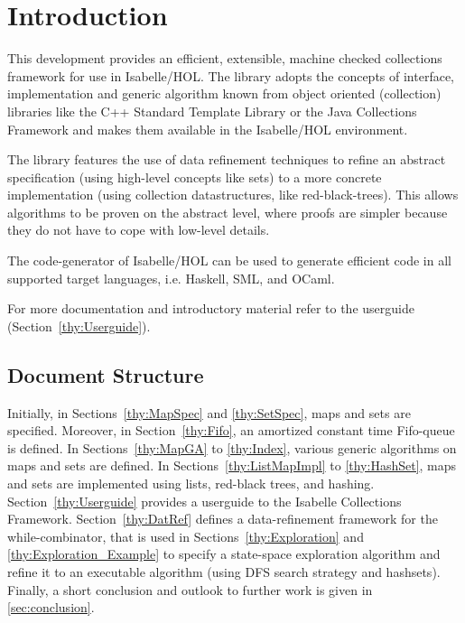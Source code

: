 \section{Introduction}
  This development provides an efficient, extensible, machine checked collections framework for use
  in Isabelle/HOL. The library adopts the concepts of interface, implementation and generic algorithm
  known from object oriented (collection) libraries like the C++ Standard Template Library\cite{C++STL} or 
  the Java Collections Framework\cite{JavaCollFr} and makes them available in the Isabelle/HOL environment.

  The library features the use of data refinement techniques to refine an abstract specification (using high-level concepts like sets) to a more concrete implementation (using collection datastructures, like red-black-trees). This allows algorithms to be proven on the abstract level, where proofs are simpler because they do not have
  to cope with low-level details.

  The code-generator of Isabelle/HOL can be used to generate efficient code in all supported target languages, i.e. Haskell, SML, and OCaml.

  For more documentation and introductory material refer to the userguide (Section~\ref{thy:Userguide}).

\subsection{Document Structure}
  Initially, in Sections~\ref{thy:MapSpec} and \ref{thy:SetSpec}, maps and sets are specified.
  Moreover, in Section~\ref{thy:Fifo}, an amortized constant time Fifo-queue is defined.
  In Sections~\ref{thy:MapGA} to \ref{thy:Index}, various generic algorithms on maps and sets are defined.
  In Sections~\ref{thy:ListMapImpl} to \ref{thy:HashSet}, maps and sets are implemented using lists, red-black trees, and hashing.
  Section~\ref{thy:Userguide} provides a userguide to the Isabelle Collections Framework. Section~\ref{thy:DatRef} defines a data-refinement framework for
  the while-combinator, that is used in Sections~\ref{thy:Exploration} and \ref{thy:Exploration_Example} to specify a state-space exploration algorithm and
  refine it to an executable algorithm (using DFS search strategy and hashsets). Finally, a short conclusion and outlook to further work is given in \ref{sec:conclusion}.

